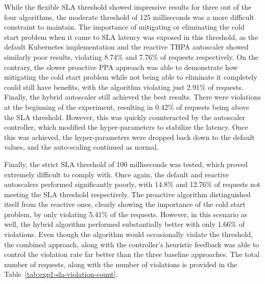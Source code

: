 While the flexible SLA threshold showed impressive results for three out of the four algorithms, the moderate threshold of 125 milliseconds was a more difficult constraint to maintain. The importance of mitigating or eliminating the cold start problem when it came to SLA latency was exposed in this threshold, as the default Kubernetes implementation and the reactive THPA autoscaler showed similarly poor results, violating 8.74\% and 7.76\% of requests respectively. On the contrary, the slower proactive PPA approach was able to demonstrate how mitigating the cold start problem while not being able to eliminate it completely could still have benefits, with the algorithm violating just 2.91\% of requests. Finally, the hybrid autoscaler still achieved the best results. There were violations at the beginning of the experiment, resulting in 0.42\% of requests being above the SLA threshold. However, this was quickly counteracted by the autoscaler controller, which modified the hyper-parameters to stabilize the latency. Once this was achieved, the hyper-parameters were dropped back down to the default values, and the auto-scaling continued as normal.\par

Finally, the strict SLA threshold of 100 milliseconds was tested, which proved extremely difficult to comply with. Once again, the default and reactive autoscalers performed significantly poorly, with 14.8\% and 12.76\% of requests not meeting the SLA threshold respectively. The proactive algorithm distinguished itself from the reactive ones, clearly showing the importance of the cold start problem, by only violating 5.41\% of the requests. However, in this scenario as well, the hybrid algorithm performed substantially better with only 1.66\% of violations. Even though the algorithm would occasionally violate the threshold, the combined approach, along with the controller's heuristic feedback was able to control the violation rate far better than the three baseline approaches. The total number of requests, along with the number of violations is provided in the Table~\ref{tab:exp1-sla-violation-count}.\par

